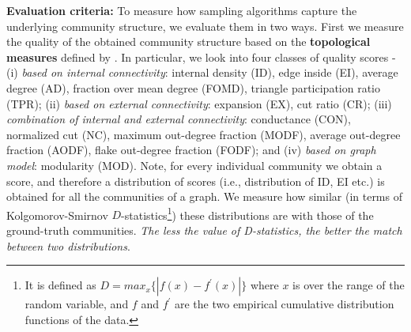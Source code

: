  {\bf Evaluation criteria:}
To measure how sampling algorithms capture the underlying community structure, we evaluate them in two ways.  First we measure the quality of the obtained community structure based on the {\bf topological measures} defined by \cite{yang2015defining}. In particular, we look into four classes of quality scores - (i) {\em based on internal connectivity}: internal density (ID), edge inside (EI), average degree (AD), fraction over mean degree (FOMD), triangle participation ratio (TPR); (ii) {\em based on external connectivity}: expansion (EX), cut ratio (CR); (iii) {\em combination of internal and external connectivity}: conductance (CON), normalized cut (NC), maximum out-degree fraction (MODF), average out-degree fraction (AODF), flake out-degree fraction (FODF); and (iv) {\em based on graph model}: modularity (MOD).
Note, for every individual community we obtain a score, and therefore a distribution of scores (i.e., distribution of ID, EI etc.) is obtained for all the communities of a graph. We measure how similar (in terms of Kolgomorov-Smirnov $D$-statistics\footnote{It is defined as $D = max_x\{|f(x) - f^{'}(x)|\}$ where $x$ is over the range of the random variable, and $f$ and $f^{'}$ are the two empirical cumulative distribution functions of the data.}) these distributions are with those of the ground-truth communities. {\em The less the value of D-statistics, the better the match between two distributions}.

